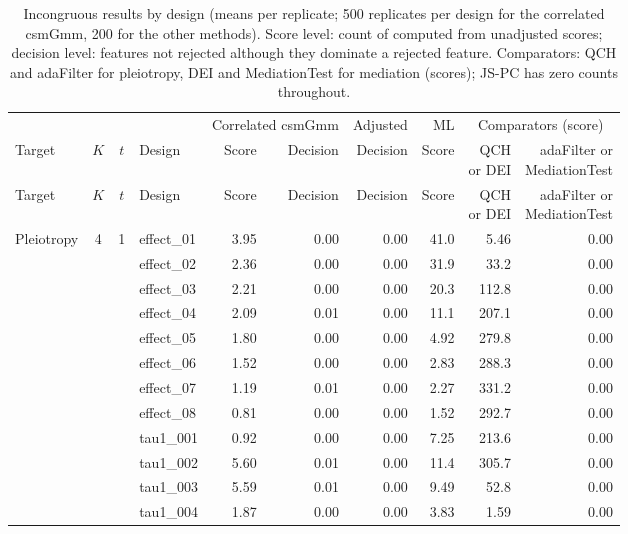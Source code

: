 {\footnotesize\setlength{\tabcolsep}{4pt}
\begin{longtable}{lccl rr r r rr}
\caption{Incongruous results by design (means per replicate; 500 replicates per design for the correlated csmGmm, 200 for the other methods). Score level: count of \citet{Sun2025} computed from unadjusted scores; decision level: features not rejected although they dominate a rejected feature. Comparators: QCH and adaFilter for pleiotropy, DEI and MediationTest for mediation (scores); JS-PC has zero counts throughout.}\label{tab:incongruity-design}\\
\toprule
 & & & & \multicolumn{2}{c}{Correlated csmGmm} & Adjusted & ML & \multicolumn{2}{c}{Comparators (score)}\\
Target & $K$ & $t$ & Design & Score & Decision & Decision & Score & \shortstack{QCH\\or DEI} & \shortstack{adaFilter or\\MediationTest}\\
\midrule
\endfirsthead
\toprule
Target & $K$ & $t$ & Design & Score & Decision & Decision & Score & \shortstack{QCH\\or DEI} & \shortstack{adaFilter or\\MediationTest}\\
\midrule
\endhead
\bottomrule
\endfoot
Pleiotropy & 4 & 1 & effect\_01 & 3.95 & 0.00 & 0.00 & 41.0 & 5.46 & 0.00\\
 &  &  & effect\_02 & 2.36 & 0.00 & 0.00 & 31.9 & 33.2 & 0.00\\
 &  &  & effect\_03 & 2.21 & 0.00 & 0.00 & 20.3 & 112.8 & 0.00\\
 &  &  & effect\_04 & 2.09 & 0.01 & 0.00 & 11.1 & 207.1 & 0.00\\
 &  &  & effect\_05 & 1.80 & 0.00 & 0.00 & 4.92 & 279.8 & 0.00\\
 &  &  & effect\_06 & 1.52 & 0.00 & 0.00 & 2.83 & 288.3 & 0.00\\
 &  &  & effect\_07 & 1.19 & 0.01 & 0.00 & 2.27 & 331.2 & 0.00\\
 &  &  & effect\_08 & 0.81 & 0.00 & 0.00 & 1.52 & 292.7 & 0.00\\
 &  &  & tau1\_001 & 0.92 & 0.00 & 0.00 & 7.25 & 213.6 & 0.00\\
 &  &  & tau1\_002 & 5.60 & 0.01 & 0.00 & 11.4 & 305.7 & 0.00\\
 &  &  & tau1\_003 & 5.59 & 0.01 & 0.00 & 9.49 & 52.8 & 0.00\\
 &  &  & tau1\_004 & 1.87 & 0.00 & 0.00 & 3.83 & 1.59 & 0.00\\

\end{longtable}}
